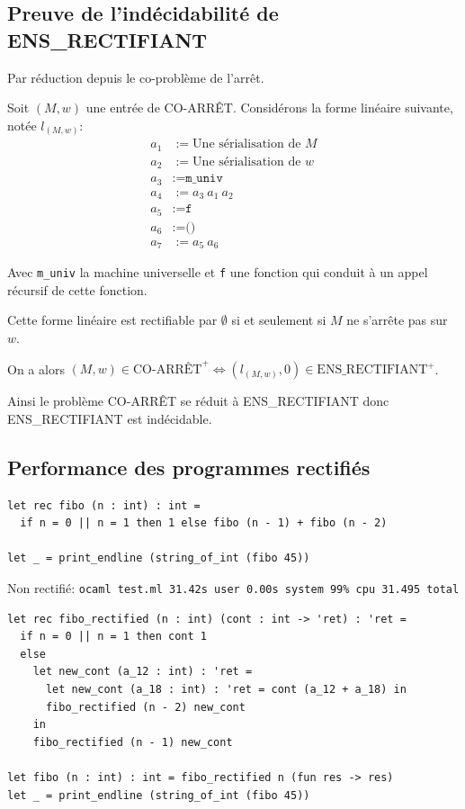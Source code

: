 \small

\pagebreak

\subsection{Preuve de l'indécidabilité de ENS\_RECTIFIANT}
Par réduction depuis le co-problème de l'arrêt.

Soit $(M, w)$ une entrée de CO-ARRÊT. Considérons la forme linéaire suivante,
notée $l_{(M, w)}$:
\begin{align*}
  a_1 & := \text{Une sérialisation de $M$} \\
  a_2 & := \text{Une sérialisation de $w$} \\
  a_3 & := \texttt{m\_univ}                \\
  a_4 & := a_3\  a_1\  a_2                 \\
  a_5 & := \texttt{f}                      \\
  a_6 & := \texttt{()}                     \\
  a_7 & := a_5 \ a_6
\end{align*}

Avec \texttt{m\_univ} la machine universelle et \texttt{f} une fonction qui
conduit à un appel récursif de cette fonction.

Cette forme linéaire est rectifiable par $\emptyset$ si et seulement si $M$
ne s'arrête pas sur $w$.

On a alors
$(M, w) \in \text{CO-ARRÊT}^+ \iff (l_{(M, w)}, 0) \in \text{ENS\_RECTIFIANT}^+$.

Ainsi le problème CO-ARRÊT se réduit à ENS\_RECTIFIANT donc ENS\_RECTIFIANT
est indécidable.

\pagebreak
\subsection{Performance des programmes rectifiés}

\begin{verbatim}
let rec fibo (n : int) : int =
  if n = 0 || n = 1 then 1 else fibo (n - 1) + fibo (n - 2)

let _ = print_endline (string_of_int (fibo 45))
\end{verbatim}

Non rectifié: \texttt{ocaml test.ml  31.42s user 0.00s system 99\% cpu 31.495 total}

\begin{verbatim}
let rec fibo_rectified (n : int) (cont : int -> 'ret) : 'ret =
  if n = 0 || n = 1 then cont 1
  else
    let new_cont (a_12 : int) : 'ret =
      let new_cont (a_18 : int) : 'ret = cont (a_12 + a_18) in
      fibo_rectified (n - 2) new_cont
    in
    fibo_rectified (n - 1) new_cont

let fibo (n : int) : int = fibo_rectified n (fun res -> res)
let _ = print_endline (string_of_int (fibo 45))
\end{verbatim}

